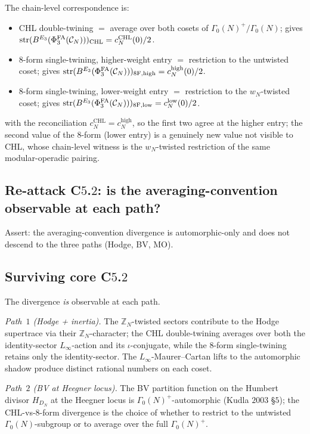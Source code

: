 The chain-level correspondence is:
\begin{itemize}
\item CHL double-twining $=$ average over both cosets of
$\Gamma_0(N)^+ / \Gamma_0(N)$; gives
$\mathrm{str}(B^{E_{3}}(\Phi^{\mathrm{FA}}_{3}(\mathcal{C}_N)))_{\mathrm{CHL}} = c_N^{\mathrm{CHL}}(0)/2$.
\item 8-form single-twining, higher-weight entry $=$ restriction to the
untwisted coset; gives
$\mathrm{str}(B^{E_{3}}(\Phi^{\mathrm{FA}}_{3}(\mathcal{C}_N)))_{\mathrm{8F, high}} =
c_N^{\mathrm{high}}(0)/2$.
\item 8-form single-twining, lower-weight entry $=$ restriction to the
$w_N$-twisted coset; gives
$\mathrm{str}(B^{E_{3}}(\Phi^{\mathrm{FA}}_{3}(\mathcal{C}_N)))_{\mathrm{8F, low}} =
c_N^{\mathrm{low}}(0)/2$.
\end{itemize}
with the reconciliation $c_N^{\mathrm{CHL}} = c_N^{\mathrm{high}}$, so
the first two agree at the higher entry; the second value of the 8-form
(lower entry) is a genuinely new value not visible to CHL, whose
chain-level witness is the $w_N$-twisted restriction of the same
modular-operadic pairing.

\subsection*{Re-attack C$5$.$2$: is the averaging-convention
observable at each path?}

Assert: the averaging-convention divergence is automorphic-only and
does not descend to the three paths (Hodge, BV, MO).

\subsection*{Surviving core C$5$.$2$}

The divergence \emph{is} observable at each path.

\emph{Path~$1$ (Hodge + inertia).} The $\mathbb{Z}_N$-twisted sectors
contribute to the Hodge supertrace via their $\mathbb{Z}_N$-character;
the CHL double-twining averages over both the identity-sector
$L_\infty$-action and its $\iota$-conjugate, while the 8-form
single-twining retains only the identity-sector. The $L_\infty$-Maurer--Cartan
lifts to the automorphic shadow produce distinct rational numbers on
each coset.

\emph{Path~$2$ (BV at Heegner locus).} The BV partition function on the
Humbert divisor $H_{D_N}$ at the Heegner locus is
$\Gamma_0(N)^+$-automorphic (Kudla $2003$ \S$5$); the CHL-vs-8-form
divergence is the choice of whether to restrict to the untwisted
$\Gamma_0(N)$-subgroup or to average over the full $\Gamma_0(N)^+$.

